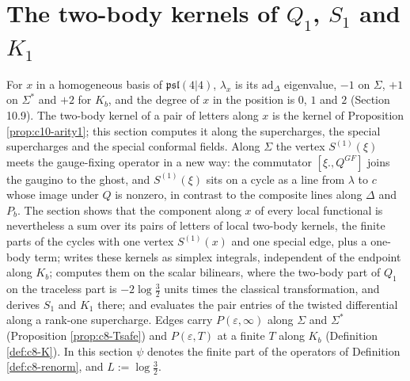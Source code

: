 \section{The two-body kernels of $Q_1$, $S_1$ and $K_1$}

For $x$ in a homogeneous basis of $\mathfrak{psl}(4|4)$, $\lambda_x$ is its $\mathrm{ad}_\Delta$ eigenvalue, $-1$ on $\Sigma$, $+1$ on $\Sigma^*$ and $+2$ for $K_b$, and the degree of $x$ in the position is $0$, $1$ and $2$ (Section 10.9). The two-body kernel of a pair of letters along $x$ is the kernel of Proposition \ref{prop:c10-arity1}; this section computes it along the supercharges, the special supercharges and the special conformal fields. Along $\Sigma$ the vertex $S^{(1)}(\xi)$ meets the gauge-fixing operator in a new way: the commutator $[\xi.,Q^{GF}]$ joins the gaugino to the ghost, and $S^{(1)}(\xi)$ sits on a cycle as a line from $\lambda$ to $c$ whose image under $Q$ is nonzero, in contrast to the composite lines along $\Delta$ and $P_b$. The section shows that the component along $x$ of every local functional is nevertheless a sum over its pairs of letters of local two-body kernels, the finite parts of the cycles with one vertex $S^{(1)}(x)$ and one special edge, plus a one-body term; writes these kernels as simplex integrals, independent of the endpoint along $K_b$; computes them on the scalar bilinears, where the two-body part of $Q_1$ on the traceless part is $-2\log\tfrac32$ units times the classical transformation, and derives $S_1$ and $K_1$ there; and evaluates the pair entries of the twisted differential along a rank-one supercharge. Edges carry $P(\varepsilon,\infty)$ along $\Sigma$ and $\Sigma^*$ (Proposition \ref{prop:c8-Tsafe}) and $P(\varepsilon,T)$ at a finite $T$ along $K_b$ (Definition \ref{def:c8-K}). In this section $\psi$ denotes the finite part of the operators of Definition \ref{def:c8-renorm}, and $L:=\log\tfrac32$.

